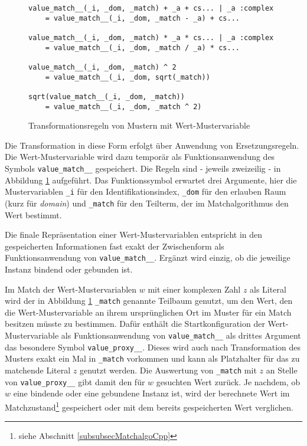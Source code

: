 \begin{figure}
\begin{verbatim}
value_match__(_i, _dom, _match) + _a + cs... | _a :complex 
    = value_match__(_i, _dom, _match - _a) + cs...
        
value_match__(_i, _dom, _match) * _a * cs... | _a :complex 
    = value_match__(_i, _dom, _match / _a) * cs...
        
value_match__(_i, _dom, _match) ^ 2                        
    = value_match__(_i, _dom, sqrt(_match))
        
sqrt(value_match__(_i, _dom, _match))                           
    = value_match__(_i, _dom, _match ^ 2)
\end{verbatim}
\label{figWertMusterBau}
\caption{Transformationsregeln von Mustern mit Wert-Mustervariable}
\end{figure}

Die Transformation in diese Form erfolgt über Anwendung von Ersetzungsregeln. Die Wert-Mustervariable wird dazu temporär als Funktionsanwendung des Symbols \verb|value_match__| gespeichert. Die Regeln sind - jeweils zweizeilig -  in Abbildung \ref{figWertMusterBau} aufgeführt. Das Funktionssymbol erwartet drei Argumente, hier die Mustervariablen \verb|_i| für den Identifikationsindex, \verb|_dom| für den erlauben Raum (kurz für \textit{domain}) und \verb|_match| für den Teilterm, der im Matchalgorithmus den Wert bestimmt. 


Die finale Repräsentation einer Wert-Mustervariablen entspricht in den gespeicherten Informationen fast exakt der Zwischenform als Funktionsanwendung von \verb|value_match__|. Ergänzt wird einzig, ob die jeweilige Instanz bindend oder gebunden ist.

Im Match der Wert-Mustervariablen $w$ mit einer komplexen Zahl $z$ als Literal wird der in Abbildung \ref{figWertMusterBau} \verb|_match| genannte Teilbaum genutzt, um den Wert, den die Wert-Mustervariable an ihrem ursprünglichen Ort im Muster für ein Match besitzen müsste zu bestimmen. Dafür enthält die Startkonfiguration der Wert-Mustervariable als Funktionsanwendung von \verb|value_match__| als drittes Argument das besondere Symbol \verb|value_proxy__|. Dieses wird auch nach Transformation des Musters exakt ein Mal in \verb|_match| vorkommen und kann als Platzhalter für das zu matchende Literal $z$ genutzt werden. Die Auswertung von \verb|_match| mit $z$ an Stelle von \verb|value_proxy__| gibt damit den für $w$ gesuchten Wert zurück. Je nachdem, ob $w$ eine bindende oder eine gebundene Instanz ist, wird der berechnete Wert im Matchzustand\footnote{siehe Abschnitt \ref{subsubsecMatchalgoCpp}} gespeichert oder mit dem bereits gespeicherten Wert verglichen.


